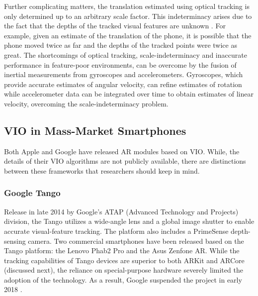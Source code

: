\documentclass[chi_draft]{sigchi}
\begin{document}
Further complicating matters, the translation estimated using optical tracking is only determined up to an arbitrary scale factor.  This indeterminacy arises due to the fact that the depths of the tracked visual features are unknown \cite{Hartley2004}.  For example, given an estimate of the translation of the phone, it is possible that the phone moved twice as far and the depths of the tracked points were twice as great.  The shortcomings of optical tracking, scale-indeterminacy and inaccurate performance in feature-poor environments, can be overcome by the fusion of inertial measurements from gyroscopes and accelerometers.  Gyroscopes, which provide accurate estimates of angular velocity, can refine estimates of rotation while accelerometer data can be integrated over time to obtain estimates of linear velocity, overcoming the scale-indeterminacy problem.

\subsection{VIO in Mass-Market Smartphones}
Both Apple and Google have released AR modules based on VIO.  While, the details of their VIO algorithms are not publicly available, there are distinctions between these frameworks that researchers should keep in mind.

\subsubsection{Google Tango}
Release in late 2014 by Google's ATAP (Advanced Technology and Projects) division, the Tango utilizes a wide-angle lens and a global image shutter to enable accurate visual-feature tracking.  The platform also includes a PrimeSense depth-sensing camera.  Two commercial smartphones have been released based on the Tango platform: the Lenovo Phab2 Pro and the Asus Zenfone AR.  While the tracking capabilities of Tango devices are superior to both ARKit and ARCore (discussed next), the reliance on special-purpose hardware severely limited the adoption of the technology.  As a result, Google suspended the project in early 2018 \cite{tangoretired}.
\end{document}
